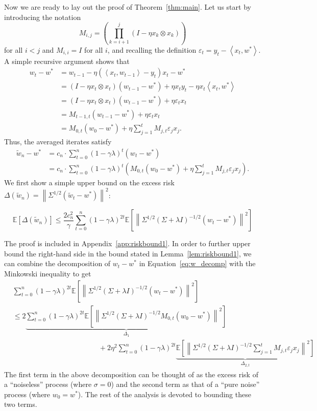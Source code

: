\documentclass[final,12pt]{colt2018} %
\newcommand{\EE}[1]{\mathbb{E}\left[#1\right]}
\newcommand{\norm}[1]{\left\|#1\right\|}
\newcommand{\pa}[1]{\left(#1\right)}
\newcommand{\wt}{\widetilde}
\newcommand{\tw}{\wt{w}}
\newcommand{\iprod}[2]{\left\langle#1, #2\right\rangle}
\begin{document}
Now we are ready to lay out the proof of Theorem~\ref{thm:main}.
Let us start by introducing the notation
\[
 M_{i,j} = \pa{\prod_{k=i+1}^j \pa{I - \eta x_k \otimes x_k}}
\]
for all $i<j$ and $M_{i,i} = I$ for all $i$,
and recalling the definition $\varepsilon_t = y_t - \iprod{x_t}{w^*}$. 
A simple recursive argument shows that
\begin{equation}\label{eq:w_decomp}
 \begin{split}
 w_t - w^* &= w_{t-1} - \eta \pa{ \iprod{x_t}{w_{t-1}} - y_t} x_t - w^*
 \\
 &= \pa{I - \eta x_t \otimes x_t} \pa{w_{t-1}- w^*} + \eta x_t y_t - \eta x_t \iprod{x_t}{w^*}
 \\
 &= \pa{I - \eta x_t \otimes x_t} \pa{w_{t-1}- w^*} + \eta \varepsilon_t x_t 
 \\
 &= M_{t-1,t} \pa{w_{t-1}- w^*} + \eta \varepsilon_t x_t 
 \\
 &= M_{0,t} \pa{w_0 - w^*} + \eta \sum_{j=1}^t M_{j,t} \varepsilon_j x_j.
 \end{split}
\end{equation}
Thus, the averaged iterates satisfy
\begin{align*}
 \tw_n - w^* &= c_n \cdot \sum_{t=0}^{n} \pa{1-\gamma\lambda}^t \pa{w_t - w^*}
 \\
 &= c_n \cdot \sum_{t=0}^{n} \pa{1-\gamma\lambda}^t \pa{M_{0,t} \pa{w_0 - w^*} + \eta \sum_{j=1}^t M_{j,t} \varepsilon_j x_j}.
\end{align*}
We first show a simple upper bound on the excess risk $\Delta(\tw_n) = \norm{\Sigma^{1/2} \pa{\tw_t - w^*}}^2$:
\begin{lemma}\label{lem:riskbound1}
 \[
  \EE{\Delta(\tw_n)} \le 
  \frac{2 c_n^2}{\gamma} \sum_{t=0}^n (1-\gamma\lambda)^{2t} \EE{\norm{\Sigma^{1/2}\pa{\Sigma + \lambda I}^{-1/2} \pa{w_t - w^*}}^2}
 \]
\end{lemma}
The proof is included in Appendix~\ref{app:riskbound1}.
In order to further upper bound the right-hand side in the bound stated in Lemma~\ref{lem:riskbound1}, we can combine the decomposition of 
$w_t - w^*$ in Equation~\eqref{eq:w_decomp} with the Minkowski inequality to get
\begin{equation}\label{eq:risk_decomp}
 \begin{split}
 &\sum_{t=0}^n (1-\gamma\lambda)^{2t} \EE{\norm{\Sigma^{1/2}\pa{\Sigma + \lambda I}^{-1/2} \pa{w_t - w^*}}^2}
 \\
 & \le 2 \underbrace{\sum_{t=0}^n (1-\gamma\lambda)^{2t} \EE{\norm{\Sigma^{1/2}\pa{\Sigma + \lambda I}^{-1/2} M_{0,t} \pa{w_0 - 
w^*}}^2}}_{\Delta_{1}}
 \\
 &\qquad\qquad\qquad\qquad\qquad\qquad + 2 \eta^2 \sum_{t=0}^n (1-\gamma\lambda)^{2t} \underbrace{\EE{\norm{\Sigma^{1/2}\pa{\Sigma + 
\lambda I}^{-1/2}\sum_{j=1}^t M_{j,t} \varepsilon_j x_j}^2}}_{\Delta_{2,t}}
 \end{split}
\end{equation}
The first term in the above decomposition can be thought of as the excess risk of a ``noiseless'' process (where $\sigma = 0$) and the 
second term as that of a ``pure noise'' process (where $w_0 = w^*$). The rest of the analysis is devoted to bounding these two terms.
\end{document}
